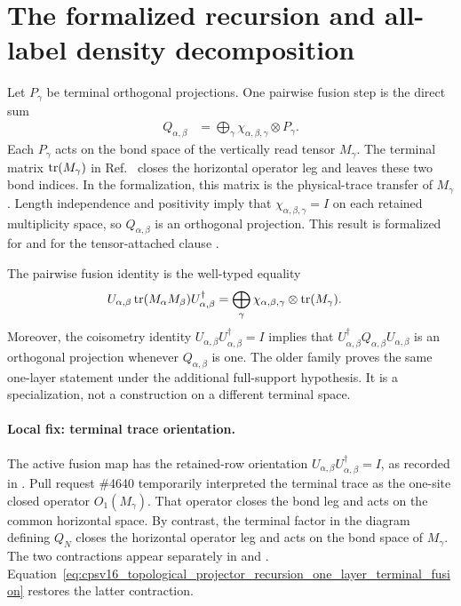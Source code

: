 \documentclass{article}
\begin{document}
\section{The formalized recursion and all-label density decomposition}

Let $P_\gamma$ be terminal orthogonal projections. One pairwise fusion step is
the direct sum
\begin{align}
    Q_{\alpha,\beta}
    &=\bigoplus_\gamma
      \chi_{\alpha,\beta,\gamma}\otimes P_\gamma.
    \label{eq:cpsv16_topological_projector_recursion_one_layer_q}
\end{align}
Each $P_\gamma$ acts on the bond space of the vertically read tensor
$M_\gamma$. The terminal matrix $\operatorname{tr}(M_\gamma)$ in
Ref.~\cite{Cirac2016MPDO_arXiv} closes the horizontal operator leg and leaves
these two bond indices. In the formalization, this matrix is the
physical-trace transfer of $M_\gamma$. Length independence and positivity
imply that $\chi_{\alpha,\beta,\gamma}=I$ on each retained multiplicity space,
so $Q_{\alpha,\beta}$ is an orthogonal projection. This result is formalized
for  and for the tensor-attached
clause .

The pairwise fusion identity is the well-typed equality
\begin{align}
    U_{\alpha,\beta}\operatorname{tr}(M_\alpha M_\beta)U_{\alpha,\beta}^\dagger
    &=\bigoplus_\gamma
      \chi_{\alpha,\beta,\gamma}\otimes\operatorname{tr}(M_\gamma).
    \label{eq:cpsv16_topological_projector_recursion_one_layer_terminal_fusion}
\end{align}
Moreover, the coisometry identity
$U_{\alpha,\beta}U_{\alpha,\beta}^\dagger=I$ implies that
$U_{\alpha,\beta}^\dagger Q_{\alpha,\beta}U_{\alpha,\beta}$ is an orthogonal
projection whenever $Q_{\alpha,\beta}$ is one. The older family
 proves the same one-layer statement
under the additional full-support hypothesis. It is a specialization, not a
construction on a different terminal space.

\paragraph{Local fix: terminal trace orientation.}
The active fusion map has the retained-row orientation
$U_{\alpha,\beta}U_{\alpha,\beta}^\dagger=I$, as recorded in
. Pull request
\#4640 temporarily interpreted the terminal trace as the one-site closed
operator $O_1(M_\gamma)$. That operator closes the bond leg and acts on the
common horizontal space. By contrast, the terminal factor in the diagram
defining $Q_N$ closes the horizontal operator leg and acts on the bond space
of $M_\gamma$. The two contractions appear separately in
 and
.
Equation~\ref{eq:cpsv16_topological_projector_recursion_one_layer_terminal_fusion}
restores the latter contraction.
\end{document}
